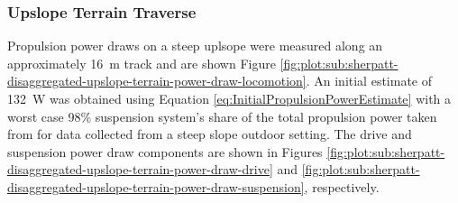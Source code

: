 \subsubsection{Upslope Terrain Traverse}
\label{sec:PowerBudget:PropulsionPowerBudget:UpslopeTerrainTraverse}
Propulsion power draws on a steep uplsope were measured along an approximately \SI{16}{\meter} track and are shown Figure \ref{fig:plot:sub:sherpatt-disaggregated-upslope-terrain-power-draw-locomotion}. An initial estimate of \SI{132}{\watt} was obtained using Equation \ref{eq:InitialPropulsionPowerEstimate} with a worst case 98\% suspension system's share of the total propulsion power taken from  for data collected from a steep slope outdoor setting. The drive and suspension power draw components are shown in Figures \ref{fig:plot:sub:sherpatt-disaggregated-upslope-terrain-power-draw-drive} and \ref{fig:plot:sub:sherpatt-disaggregated-upslope-terrain-power-draw-suspension}, respectively.

